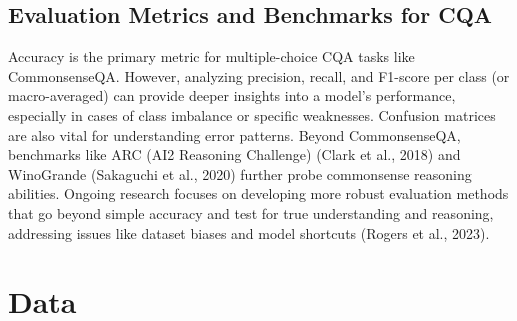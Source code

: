 \documentclass[10.5pt]{article}
\begin{document}
\subsection{Evaluation Metrics and Benchmarks for CQA}
Accuracy is the primary metric for multiple-choice CQA tasks like CommonsenseQA. However, analyzing precision, recall, and F1-score per class (or macro-averaged) can provide deeper insights into a model's performance, especially in cases of class imbalance or specific weaknesses. Confusion matrices are also vital for understanding error patterns. Beyond CommonsenseQA, benchmarks like ARC (AI2 Reasoning Challenge) (Clark et al., 2018) and WinoGrande (Sakaguchi et al., 2020) further probe commonsense reasoning abilities. Ongoing research focuses on developing more robust evaluation methods that go beyond simple accuracy and test for true understanding and reasoning, addressing issues like dataset biases and model shortcuts (Rogers et al., 2023).

\newpage
\section{Data}
\end{document}
